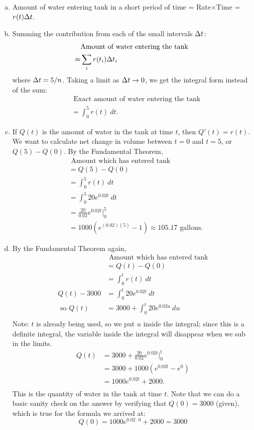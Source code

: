 \begin{enumerate}[1.]
\begin{multicols}{2}
  \begin{Solution}
    \begin{enumerate}[(a)]
    \item  Amount of water entering tank in a short period of time = Rate$\times$Time = $r(t) \Delta t$.
    \item Summing the contribution from each of the small intervals $\Delta t$:
\begin{align*}
&       \mbox{Amount of water entering the tank } \\
   \approx & \sum_{i} r(t_i) \Delta t_i 
\end{align*}where $\Delta t = 5/n$.
Taking a limit as $\Delta t \to 0$, we get the integral form instead of the sum:
\begin{align*}
&\mbox{ Exact amount of water entering the tank} \\
& = \int^5_0 r(t) ~dt.
\end{align*}
\item If $Q(t)$ is the amount of water in the tank at time $t$, then
  $Q'(t) = r(t)$. We want to calculate net change in volume between
  $t=0$ and $t=5$, or $Q(5) - Q(0)$. By the Fundamental Theorem,
  \begin{align*}
&  \mbox{ Amount which has entered tank} \\
& = Q(5) - Q(0) \\
&  = \int^5_0 r(t)~dt  \\
& = \int^5_0 20e^{0.02t}~dt  \\
&= \frac{20 }{0.02} e^{0.02t} \Big|^5_0 \\
& = 1000(e^{(0.02)(5)} - 1) \approx 105.17 \mbox{ gallons}.
  \end{align*}
\item By the Fundamental Theorem again,
  \begin{align*}
& \mbox{ Amount which has entered tank} \\
& = Q(t) - Q(0)  \\
& = \int^t_0 r(t)~dt  \\
Q(t) - 3000 & = \int^t_0 20e^{0.02t}~dt  \\
\mbox{ so } Q(t) & = 3000 + \int^t_0 20e^{0.02u}~du \\
\end{align*}
Note: $t$ is already being used, so we put $u$ inside the integral; since
this is a definite integral, the variable inside the integral will disappear when
we sub in the limits. 
\begin{align*}
Q(t) & = 3000 + \frac{20}{ 0.02} e^{0.02t} \Big|^t_0 \\
& = 3000 + 1000(e^{0.02t} - e^0) \\
& = 1000e^{0.02t} + 2000. \\
  \end{align*}
  This is the quantity of water in the tank at time $t$.  Note that we
  can do a basic sanity check on the answer by verifying that $Q(0) =
  3000$ (given), which is true for the formula we arrived at:
$$Q(0) = 1000e^{0.02\cdot 0} + 2000 = 3000$$
    \end{enumerate}
  \end{Solution}


\end{multicols}
\end{enumerate}
